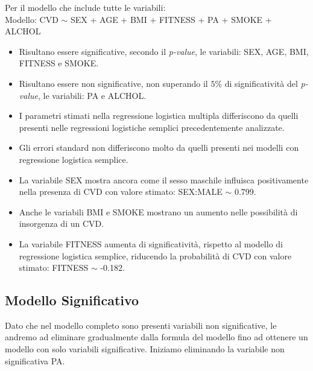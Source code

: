 \documentclass{article}\usepackage[]{graphicx}\usepackage[]{xcolor}
\begin{document}
    Per il modello che include tutte le variabili:\\
    Modello: CVD $\sim$ SEX + AGE + BMI + FITNESS + PA + SMOKE + ALCHOL 
    \begin{itemize}
      \item Risultano essere significative, secondo il \emph{p-value}, le 
            variabili: SEX, AGE, BMI, FITNESS e SMOKE.
      \item Risultano essere non significative, non superando il $5\%$
            di significatività del \emph{p-value}, le variabili: PA e ALCHOL.
      \item I parametri stimati nella regressione logistica multipla differiscono
            da quelli presenti nelle regressioni logistiche semplici precedentemente
            analizzate.
      \item Gli errori standard non differiscono molto da quelli presenti nei
            modelli con regressione logistica semplice.
      \item La variabile SEX mostra ancora come il sesso maschile influisca 
            positivamente nella presenza di CVD con valore stimato: 
            SEX:MALE $\sim$ 0.799.
      \item Anche le variabili BMI e SMOKE mostrano un aumento nelle possibilità 
            di insorgenza di un CVD.
      \item La variabile FITNESS aumenta di significatività, rispetto
            al modello di regressione logistica semplice, riducendo la 
            probabilità di CVD con valore stimato: FITNESS $\sim$ -0.182.
    \end{itemize}
  
  \subsection{Modello Significativo}
    Dato che nel modello completo sono presenti variabili non significative,
    le andremo ad eliminare gradualmente dalla formula del modello fino ad 
    ottenere un modello con solo variabili significative.
    Iniziamo eliminando la variabile non significativa PA.
    
\end{document}
